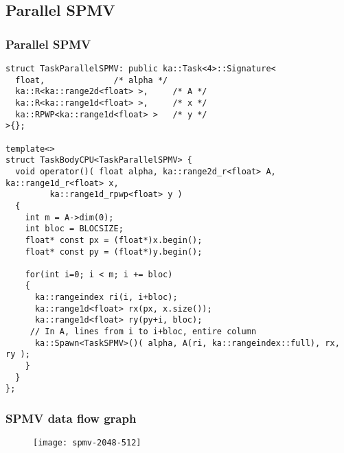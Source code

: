 \subsection{Parallel SPMV}
\begin{frame}
  \frametitle{Parallel SPMV}
  \begin{block}{}
\begin{lstlisting}[basicstyle=\scriptsize\ttfamily]
struct TaskParallelSPMV: public ka::Task<4>::Signature<
  float,			  /* alpha */
  ka::R<ka::range2d<float> >,	  /* A */
  ka::R<ka::range1d<float> >,	  /* x */
  ka::RPWP<ka::range1d<float> >	  /* y */
>{};

template<>
struct TaskBodyCPU<TaskParallelSPMV> {
  void operator()( float alpha, ka::range2d_r<float> A, ka::range1d_r<float> x,
         ka::range1d_rpwp<float> y )
  {
    int m = A->dim(0);
    int bloc = BLOCSIZE;
    float* const px = (float*)x.begin();
    float* const py = (float*)y.begin();
    
    for(int i=0; i < m; i += bloc)
    {
      ka::rangeindex ri(i, i+bloc);
      ka::range1d<float> rx(px, x.size());
      ka::range1d<float> ry(py+i, bloc);
     // In A, lines from i to i+bloc, entire column 
      ka::Spawn<TaskSPMV>()( alpha, A(ri, ka::rangeindex::full), rx, ry );
    }
  }
};
\end{lstlisting}
  \end{block}
\end{frame}
\begin{frame}[plain]
  \frametitle{SPMV data flow graph}
  \begin{figure}[ht]
  \centering
  \texttt{[image: spmv-2048-512]}
  \end{figure}
\end{frame}

